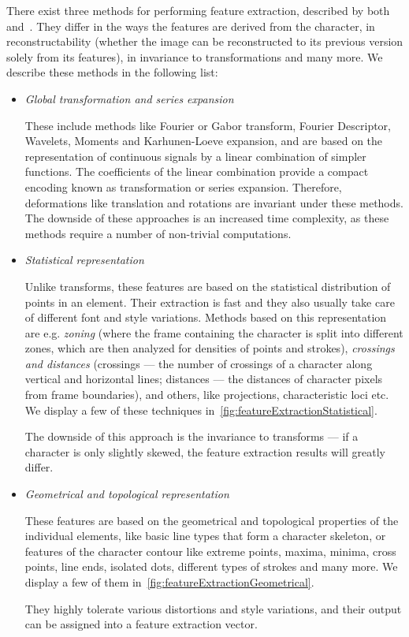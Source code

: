 There exist three methods for performing feature extraction, described by both~\citet{featureExtractionBook} and~\citet{featureExtractiontext}. They differ in the ways the features are derived from the character, in reconstructability (whether the image can be reconstructed to its previous version solely from its features), in invariance to transformations and many more. We describe these methods in the following list:

\begin{itemize}

\item \emph{Global transformation and series expansion}

These include methods like Fourier or Gabor transform, Fourier Descriptor, Wavelets, Moments and Karhunen-Loeve expansion, and are based on the representation of continuous signals by a linear combination of simpler functions. The coefficients of the linear combination provide a compact encoding known as transformation or series expansion. Therefore, deformations like translation and rotations are invariant under these methods. The downside of these approaches is an increased time complexity, as these methods require a number of non-trivial computations.

\item \emph{Statistical representation}

Unlike transforms, these features are based on the statistical distribution of points in an element. Their extraction is fast and they also usually take care of different font and style variations. Methods based on this representation are e.g. \emph{zoning} (where the frame containing the character is split into different zones, which are then analyzed for densities of points and strokes), \emph{crossings and distances} (crossings --- the number of crossings of a character along vertical and horizontal lines; distances --- the distances of character pixels from frame boundaries), and others, like projections, characteristic loci etc. We display a few of these techniques in~\cref{fig:featureExtractionStatistical}.

The downside of this approach is the invariance to transforms --- if a character is only slightly skewed, the feature extraction results will greatly differ.

\item \emph{Geometrical and topological representation}

These features are based on the geometrical and topological properties of the individual elements, like basic line types that form a character skeleton, or features of the character contour like extreme points, maxima, minima, cross points, line ends, isolated dots, different types of strokes and many more. We display a few of them in~\cref{fig:featureExtractionGeometrical}.

They highly tolerate various distortions and style variations, and their output can be assigned into a feature extraction vector.

\end{itemize}

